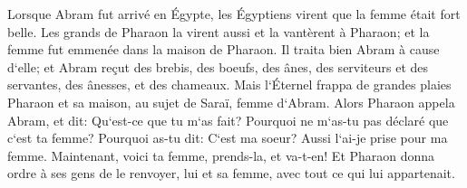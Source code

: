\verse Lorsque Abram fut arrivé en Égypte, les Égyptiens virent que la femme était fort belle. 
\verse Les grands de Pharaon la virent aussi et la vantèrent à Pharaon; et la femme fut emmenée dans la maison de Pharaon. 
\verse Il traita bien Abram à cause d`elle; et Abram reçut des brebis, des boeufs, des ânes, des serviteurs et des servantes, des ânesses, et des chameaux. 
\verse Mais l`Éternel frappa de grandes plaies Pharaon et sa maison, au sujet de Saraï, femme d`Abram. 
\verse Alors Pharaon appela Abram, et dit: Qu`est-ce que tu m`as fait? Pourquoi ne m`as-tu pas déclaré que c`est ta femme? 
\verse Pourquoi as-tu dit: C`est ma soeur? Aussi l`ai-je prise pour ma femme. Maintenant, voici ta femme, prends-la, et va-t-en! 
\verse Et Pharaon donna ordre à ses gens de le renvoyer, lui et sa femme, avec tout ce qui lui appartenait. 

